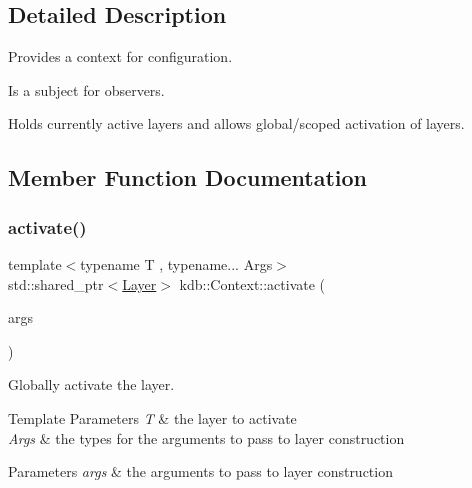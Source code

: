 \subsection{Detailed Description}
Provides a context for configuration. 

Is a subject for observers.

Holds currently active layers and allows global/scoped activation of layers. 

\subsection{Member Function Documentation}
\mbox{\label{classkdb_1_1Context_ae6313bea68b242fa50817c604a67e704}} 
\subsubsection{\texorpdfstring{activate()}{activate()}}
{\footnotesize\ttfamily template$<$typename T , typename... Args$>$ \\
std\+::shared\+\_\+ptr$<$\mbox{\hyperlink{classkdb_1_1Layer}{Layer}}$>$ kdb\+::\+Context\+::activate (\begin{DoxyParamCaption}\item[{Args \&\&...}]{args }\end{DoxyParamCaption})\hspace{0.3cm}{\ttfamily [inline]}}



Globally activate the layer. 


\begin{DoxyTemplParams}{Template Parameters}
{\em T} & the layer to activate \\
\hline
{\em Args} & the types for the arguments to pass to layer construction \\
\hline
\end{DoxyTemplParams}

\begin{DoxyParams}{Parameters}
{\em args} & the arguments to pass to layer construction \\
\hline
\end{DoxyParams}
\mbox{\label{classkdb_1_1Context_afcbfe897ee36eb4fee23640051122e54}} 
